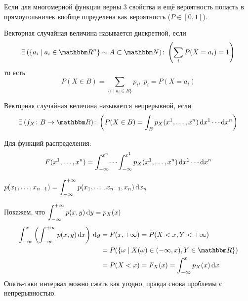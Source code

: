 \documentclass[12pt,timbord]{../../../notes}
\begin{document}
\begin{rem}\label{rem:stat::randvec::exvaldist}
  Если для многомерной функции верны 3 свойства и ещё вероятность попасть в прямоугольничек вообще определена как вероятность
  ($P\in [0,1]$).
\end{rem}


\begin{defn}\label{defn:stat::randvec::disc}
  Векторная случайная величина называется дискретной, если
  \[
    \exists\,(\{a_i\mid a_i \in \R^n \} \sim A \subset \N)\colon \left( \sum_{i} P(X = a_i) = 1 \right)
  \]
  то есть 
  \[
    P(X\in B) = \sum_{\{i\mid a_i\in B\}} p_i, \; p_i = P(X = a_i)
  \]
\end{defn}
\begin{defn}\label{defn:stat::randvec::cony}
  Векторная случайная величина называется непрерывной, если
  \[
    \exists\,(f_X\colon B\to \R )\colon \left( P(X\in B) = \int_{B} p_X(x^1, \dotsc, x^n)\, \del
    x^1 \dotsm \del x^n \right)
  \]
\end{defn}
\begin{rem}\label{rem:stat::randvec::distfun }
  Для функций распределения:
  \[
    F(x^1, \dotsc, x^n) = \int_{-\infty}^{x^n}\dotsi\int_{-\infty}^{x^1} p_X(x^1, \dotsc, x^n)\,
    \mathrm{d} x^1 \dotsm \mathrm{d} x^n 
  \]
\end{rem}

\begin{prop}\label{prop:stat::randvec::reduce}
  $p({x_1, \dotsc, x_{n-1}}) = \displaystyle\int_{-\infty}^{+\infty} p({x_1, \dotsc, x_{n-1}, x_n})\, \mathrm{d} x_n$
\end{prop}
\begin{itlproof}
  Покажем, что $\displaystyle\int_{-\infty}^{+\infty} p(x,y) \,\mathrm{d} y = p_X(x)$
  \[
    \begin{split}
      \int_{-\infty}^x \left(\intR p(x,y) \,\del x\right) \, \del y &= F(x, +\infty) = 
      P(X<x, Y<+\infty) \\
      &= P(\{\omega\mid X(\omega)\in (-\infty, x), Y\in \R\}) \\
      &= P(X<x) = F_X(x) = \int_{-\infty}^x p_X(x) \, \del x
    \end{split}
  \]
  Опять-таки интервал можно сжать как угодно, правда снова проблемы с непрерывностью.

\end{itlproof}
\end{document}

